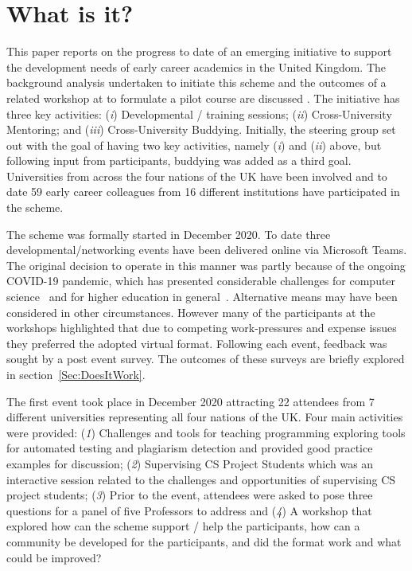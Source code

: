 \documentclass[sigconf]{acmart}
\begin{document}
\section{What is it?}	
\label{sec:What}
This paper reports on the progress to date of an emerging initiative
to support the development needs of early career academics in the
United Kingdom. The background analysis undertaken to initiate this
scheme and the outcomes of a related workshop at  to formulate a pilot course are
discussed . The initiative has three key
activities: ({\emph{i}}) Developmental / training sessions;
({\emph{ii}}) Cross-University Mentoring; and ({\emph{iii}})
Cross-University Buddying. Initially, the steering group set out with
the goal of having two key activities, namely ({\emph{i}}) and
({\emph{ii}}) above, but following input from participants, buddying
was added as a third goal. Universities from across the four nations
of the UK have been involved and to date 59 early career colleagues
from 16 different institutions have participated in the scheme.

The scheme was formally started in December 2020. To date three
developmental/networking events have been delivered online via
Microsoft Teams. The original decision to operate in this manner was
partly because of the ongoing COVID-19 pandemic, which has presented
considerable challenges for computer
science~\cite{crick-et-al:ukicer2020,wg1:iticse2021} and for higher
education in
general~\cite{watermeyer-et-al:he2020,CrickCovidUK}. Alternative means
may have been considered in other circumstances. However many of the
participants at the workshops highlighted that due to competing
work-pressures and expense issues they preferred the adopted virtual
format. Following each event, feedback was sought by a post event
survey. The outcomes of these surveys are briefly explored in
section~\ref{Sec:DoesItWork}.

The first event took place in December 2020 attracting 22 attendees
from 7 different universities representing all four nations of the
UK. Four main activities were provided: ({\emph{1}}) Challenges and
tools for teaching programming exploring tools for automated testing
and plagiarism detection and provided good practice examples for
discussion; ({\emph{2}}) Supervising CS Project Students which was an
interactive session related to the challenges and opportunities of
supervising CS project students; ({\emph{3}}) Prior to the event,
attendees were asked to pose three questions for a panel of five
Professors to address and ({\emph{4}}) A workshop that explored how
can the scheme support / help the participants, how can a community be
developed for the participants, and did the format work and what could
be improved?
\end{document}
